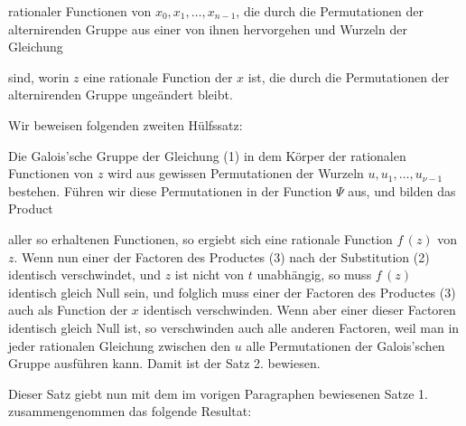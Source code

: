 rationaler Functionen von $x_0, x_1, \ldots, x_{n-1}$, die durch die
Permutationen der alternirenden Gruppe aus einer von ihnen hervorgehen und
Wurzeln der Gleichung


sind, worin $z$ eine rationale Function der $x$ ist, die durch die
Permutationen der alternirenden Gruppe ungeändert bleibt.

Wir beweisen folgenden zweiten Hülfssatz:




Die Galois'sche Gruppe der Gleichung (1) in dem Körper der rationalen
Functionen von $z$ wird aus gewissen Permutationen der Wurzeln
$u, u_1, \ldots, u_{\nu-1}$ bestehen. Führen wir diese Permutationen in
der Function $\Psi$ aus, und bilden das Product


aller so erhaltenen Functionen, so ergiebt sich eine rationale Function
$f\,(z)$ von $z$. Wenn nun einer der Factoren des Productes (3) nach der
Substitution (2) identisch verschwindet, und $z$ ist nicht von $t$
unabhängig, so muss $f\,(z)$ identisch gleich Null sein, und folglich muss
einer der Factoren des Productes (3) auch als Function der $x$ identisch
verschwinden. Wenn aber einer dieser Factoren identisch gleich Null ist,
so verschwinden auch alle anderen Factoren, weil man in jeder rationalen
Gleichung zwischen den $u$ alle Permutationen der Galois'schen Gruppe
ausführen kann. Damit ist der Satz 2. bewiesen.

Dieser Satz giebt nun mit dem im vorigen Paragraphen bewiesenen Satze 1.
zusammengenommen das folgende Resultat:

